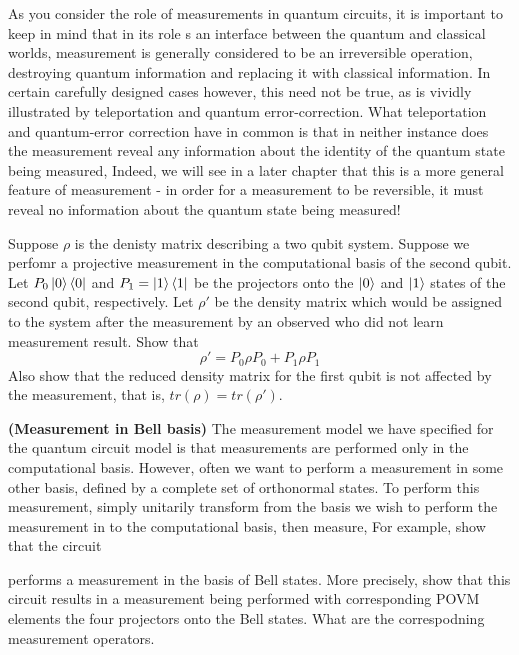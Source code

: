 As you consider the role of measurements in quantum circuits, it is important to keep in mind that in its role s an interface between the quantum and classical worlds, measurement is generally considered to be an irreversible operation, destroying quantum information and replacing it with classical information. In certain carefully designed cases however, this need not be true, as is vividly illustrated by teleportation and quantum error-correction. What teleportation and quantum-error correction have in common is that in neither instance does the measurement reveal any information about the identity of the quantum state being measured, Indeed, we will see in a later chapter that this is a more general feature of measurement - in order for a measurement to be reversible, it must reveal no information about the quantum state being measured!

\begin{example}
    Suppose $\rho$ is the denisty matrix describing a two qubit system. Suppose we perfomr a projective measurement in the computational basis of the second qubit. Let $P_0\ket{0}\bra{0}$ and $P_1=\ket{1}\bra{1}$ be the projectors onto the $\ket{0}$ and $\ket{1}$ states of the second qubit, respectively. Let $\rho'$ be the density matrix which would be assigned to the system after the measurement by an observed who did not learn measurement result. Show that
    \[
    \rho'=P_0\rho P_0 + P_1 \rho P_1
    \]
    Also show that the reduced density matrix for the first qubit is not affected by the measurement, that is, $tr(\rho)=tr(\rho')$.
\end{example}

\begin{example}
\textbf{(Measurement in Bell basis)} The measurement model we have specified for the quantum circuit model is that measurements are performed only in the computational basis. However, often we want to perform a measurement in some other basis, defined by a complete set of orthonormal states. To perform this measurement, simply unitarily transform from the basis we wish to perform the measurement in to the computational basis, then measure, For example, show that the circuit

performs a measurement in the basis of Bell states. More precisely, show that this circuit results in a measurement being performed with corresponding POVM elements the four projectors onto the Bell states. What are the correspodning measurement operators.
\end{example}


